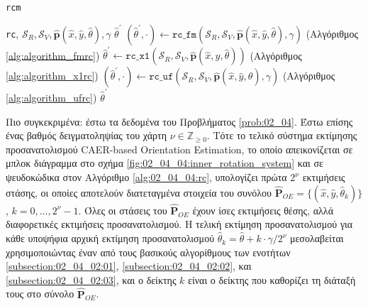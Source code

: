 \begin{algorithm}
  \caption{\texttt{rcm}}
  \label{alg:02_04_04:rcm}
  \begin{spacing}{1.5}
  \begin{algorithmic}[1]
    \REQUIRE \texttt{rc}, $\mathcal{S}_R, \mathcal{S}_V, \hat{\bm{p}}(\hat{x}, \hat{y}, \hat{\theta}), \gamma$
    \ENSURE $\hat{\theta}^\prime$
      \STATE $(\hat{\theta}^\prime, \cdot) \leftarrow \texttt{rc\_fm}(\mathcal{S}_R, \mathcal{S}_V, \hat{\bm{p}}(\hat{x}, \hat{y}, \hat{\theta}), \gamma)$ \hfill (Αλγόριθμος \ref{alg:algorithm_fmrc})
      \STATE $\hat{\theta}^\prime \leftarrow \texttt{rc\_x1}(\mathcal{S}_R, \mathcal{S}_V, \hat{\bm{p}}(\hat{x}, \hat{y}, \hat{\theta}))$ \hfill (Αλγόριθμος \ref{alg:algorithm_x1rc})
      \STATE $(\hat{\theta}^\prime, \cdot) \leftarrow \texttt{rc\_uf}(\mathcal{S}_R, \mathcal{S}_V, \hat{\bm{p}}(\hat{x}, \hat{y}, \hat{\theta}), \gamma)$ \hfill (Αλγόριθμος \ref{alg:algorithm_ufrc})
    \ENDIF
    \RETURN $\hat{\theta}^\prime$
  \end{algorithmic}
  \end{spacing}
\end{algorithm}


Πιο συγκεκριμένα: έστω τα δεδομένα του Προβλήματος \ref{prob:02_04}. Έστω
επίσης ένας βαθμός δειγματοληψίας του χάρτη $\nu \in \mathbb{Z}_{\geq 0}$. Τότε
το τελικό σύστημα εκτίμησης προσανατολισμού CAER-based Orientation Estimation,
το οποίο απεικονίζεται σε μπλοκ διάγραμμα στο σχήμα
\ref{fig:02_04_04:inner_rotation_system} και σε ψευδοκώδικα στον Αλγόριθμο
\ref{alg:02_04_04:rc}, υπολογίζει πρώτα $2^\nu$ εκτιμήσεις στάσης, οι οποίες
αποτελούν διατεταγμένα στοιχεία του συνόλου $\hat{\bm{P}}_{OE} = \{(\hat{x},
\hat{y}, \hat{\theta}_k)\}$, $k = 0,\dots,2^\nu-1$.  Όλες οι στάσεις του
$\hat{\bm{P}}_{OE}$ έχουν ίσες εκτιμήσεις θέσης, αλλά διαφορετικές εκτιμήσεις
προσανατολισμού. Η τελική εκτίμηση προσανατολισμού για κάθε υποψήφια αρχική
εκτίμηση προσανατολισμού $\hat{\theta}_k = \hat{\theta} + k \cdot \gamma
/2^\nu$ μεσολαβείται χρησιμοποιώντας έναν από τους βασικούς αλγορίθμους των
ενοτήτων \ref{subsection:02_04_02:01}, \ref{subsection:02_04_02:02}, και
\ref{subsection:02_04_02:03}, και ο δείκτης $k$ είναι ο δείκτης που καθορίζει
τη διάταξή τους στο σύνολο $\hat{\bm{P}}_{OE}$.

